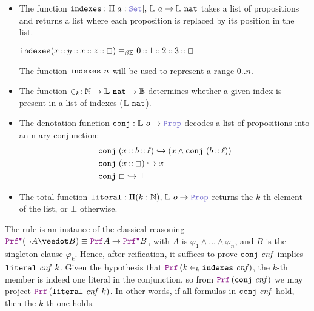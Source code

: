 \begin{itemize}
  \item The function $\kw{indexes}: \Pi [a: \set],\, \bb{L}~a \ra \bb{L}~\kw{nat}$  takes a list of propositions and returns a list where each proposition is replaced by its position in the list.
  \begin{example}[indexes]
  \(
    \mathop{\mathtt{indexes}} (x \mathbin{\mathbin{::}} y \mathbin{\mathbin{::}} x  \mathbin{\mathbin{::}} z \mathbin{\mathbin{::}} \Box) \equiv_{\beta\Sigma} 0 \mathbin{\mathbin{::}} 1 \mathbin{\mathbin{::}} 2 \mathbin{\mathbin{::}} 3 \mathbin{\mathbin{::}} \Box
  \)
  \end{example}
  The function $\texttt{\upshape{indexes}}~n$ will be used to represent a range $0..n$.
  \item The function $\in_k : \mathbb{N} \rightarrow \mathbb{L}~\texttt{\upshape{nat}} \rightarrow \mathbb{B}$  determines whether a given index is present in a list of indexes ($\mathbb{L}~\texttt{\upshape{nat}}$).
  \item The denotation function $\kw{conj}: \bb{L}~o \ra \prop$ decodes a list of propositions into an n-ary conjunction:
  \[
    \begin{aligned}
    & \texttt{\upshape{conj}}~(x \mathbin{::} b \mathbin{::} \ell) \hookrightarrow (x \land \texttt{\upshape{conj}}~(b \mathbin{::} \ell))\\
    & \texttt{\upshape{conj}}~(x \mathbin{::} \Box) \hookrightarrow x\\
    & \texttt{\upshape{conj}}~\Box \hookrightarrow \top
    \end{aligned}
    \]
  \item The total function $\kw{literal}: \Pi (k: \N),\, \bb{L}~o \ra \prop$ returns the $k$-th element of the list, or $\bot$ otherwise.
\end{itemize}

The rule  is an instance of the classical reasoning \(\prfcl (\neg A \veedot B) \equiv \prf A \ra \prfcl B\),
with $A$ is $\varphi_1 \land \dots \land \varphi_n$, and $B$ is the singleton clause $\varphi_k$.
Hence, after reification, it suffices to prove $\texttt{\upshape{conj}}~\mathit{cnf}$ implies $\texttt{\upshape{literal}}~\mathit{cnf}~k$.
Given the hypothesis that \(\prf\,(k \in_k \kw{indexes}~\mathit{cnf})\), the $k$-th member is indeed one literal in the conjunction, so from \(\prf\,(\kw{conj}~\mathit{cnf})\) we may project \(\prf\,(\kw{literal}~\mathit{cnf}~k)\).
In other words, if all formulas in \(\texttt{\upshape{conj}}~\mathit{cnf}\) hold, then the $k$-th one holds.

